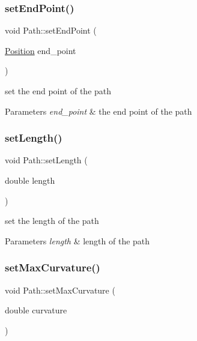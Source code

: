 \subsubsection{\texorpdfstring{set\+End\+Point()}{setEndPoint()}}
{\footnotesize\ttfamily void Path\+::set\+End\+Point (\begin{DoxyParamCaption}\item[{\mbox{\hyperlink{class_position}{Position}}}]{end\+\_\+point }\end{DoxyParamCaption})}



set the end point of the path 


\begin{DoxyParams}{Parameters}
{\em end\+\_\+point} & the end point of the path \\
\hline
\end{DoxyParams}
\mbox{\label{class_path_ad723ba990a07d7542703770a09df52a7}} 
\subsubsection{\texorpdfstring{set\+Length()}{setLength()}}
{\footnotesize\ttfamily void Path\+::set\+Length (\begin{DoxyParamCaption}\item[{double}]{length }\end{DoxyParamCaption})}



set the length of the path 


\begin{DoxyParams}{Parameters}
{\em length} & length of the path \\
\hline
\end{DoxyParams}
\mbox{\label{class_path_a132d54dc6350d1c2eb86611db60df7ff}} 
\subsubsection{\texorpdfstring{set\+Max\+Curvature()}{setMaxCurvature()}}
{\footnotesize\ttfamily void Path\+::set\+Max\+Curvature (\begin{DoxyParamCaption}\item[{double}]{curvature }\end{DoxyParamCaption})}



